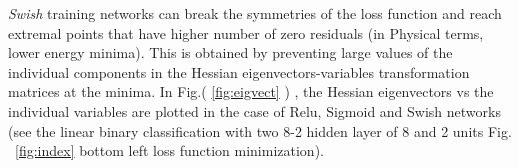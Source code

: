 \documentclass{article}
\begin{document}
{\it Swish} training networks can break the symmetries of the loss function and reach extremal points that have higher number of zero residuals (in Physical terms, lower energy minima).
This is obtained by preventing large values of the individual components in the Hessian eigenvectors-variables transformation matrices at the minima. In Fig.( \ref{fig:eigvect} ) , the Hessian eigenvectors vs the individual variables are plotted in the case of Relu, Sigmoid and Swish networks (see the linear binary classification with two 8-2 hidden layer of 8 and 2 units Fig. ~\eqref{fig:index} bottom left loss function minimization). %
%
%
\end{document}
